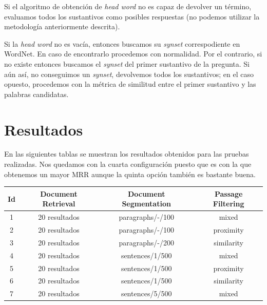 \documentclass[12pt,a4paper,titlepage]{article}
\begin{document}
Si el algoritmo de obtención de \emph{head word} no es capaz de devolver un término, evaluamos todos los sustantivos como posibles respuestas (no podemos utilizar la metodología anteriormente descrita).

Si la \emph{head word} no es vacía, entonces buscamos su \emph{synset} correspodiente en WordNet. En caso de encontrarlo procedemos con normalidad. Por el contrario, si no existe entonces buscamos el \emph{synset} del primer sustantivo de la pregunta. Si aún así, no conseguimos un \emph{synset}, devolvemos todos los sustantivos; en el caso opuesto, procedemos con la métrica de similitud entre el primer sustantivo y las palabras candidatas.

\clearpage
\section{Resultados}
En las siguientes tablas se muestran los resultados obtenidos para las pruebas realizadas. Nos quedamos con la cuarta configuración puesto que es con la que obtenemos un mayor MRR aunque la quinta opción también es bastante buena.

\begin{table}[h!]
\begin{center}
\begin{tabular}{|c|c|c|c|}
\hline
Id & Document Retrieval & Document Segmentation & Passage Filtering\\\hline
1 & 20 resultados & paragraphs/-/100 & mixed\\\hline
2 & 20 resultados & paragraphs/-/100 & proximity\\\hline
3 & 20 resultados & paragraphs/-/200 & similarity\\\hline
4 & 20 resultados & sentences/1/500 & mixed\\\hline
5 & 20 resultados & sentences/1/500 & proximity\\\hline
6 & 20 resultados & sentences/1/500 & similarity\\\hline
7 & 20 resultados & sentences/5/500 & mixed\\\hline
\end{tabular}
\end{center}
\end{table}
\end{document}
